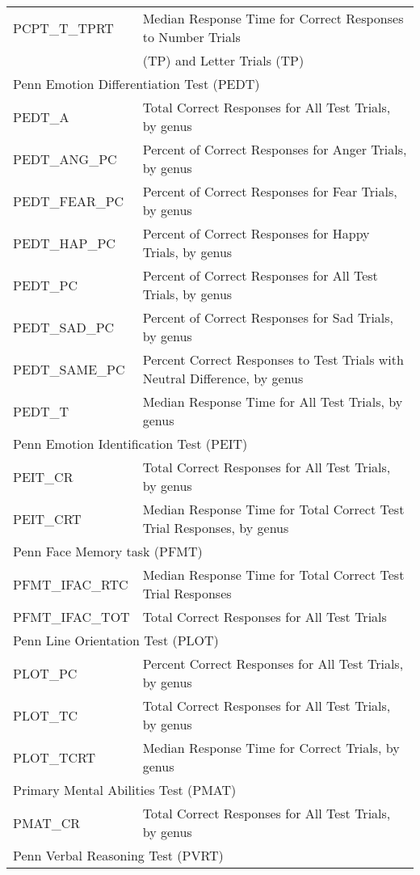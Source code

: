 \documentclass{article}
\begin{document}
\begin{longtable}{ll}
PCPT\_T\_TPRT & Median Response Time for Correct Responses to Number Trials\\
& (TP) and Letter Trials (TP)\\
\midrule
\multicolumn{2}{l}{Penn Emotion Differentiation Test (PEDT)}\\
\midrule
PEDT\_A & Total Correct Responses for All Test Trials, by genus\\
PEDT\_ANG\_PC & Percent of Correct Responses for Anger Trials, by genus\\
PEDT\_FEAR\_PC & Percent of Correct Responses for Fear Trials, by genus\\
PEDT\_HAP\_PC & Percent of Correct Responses for Happy Trials, by genus\\
PEDT\_PC & Percent of Correct Responses for All Test Trials, by genus\\
PEDT\_SAD\_PC & Percent of Correct Responses for Sad Trials, by genus\\
PEDT\_SAME\_PC & Percent Correct Responses to Test Trials with Neutral Difference, by genus\\
PEDT\_T & Median Response Time for All Test Trials, by genus\\
\midrule
\multicolumn{2}{l}{Penn Emotion Identification Test (PEIT)}\\
\midrule
PEIT\_CR & Total Correct Responses for All Test Trials, by genus\\
PEIT\_CRT & Median Response Time for Total Correct Test Trial Responses, by genus\\
\midrule
\multicolumn{2}{l}{Penn Face Memory task (PFMT)}\\
\midrule
PFMT\_IFAC\_RTC & Median Response Time for Total Correct Test Trial Responses\\
PFMT\_IFAC\_TOT & Total Correct Responses for All Test Trials\\
\midrule
\multicolumn{2}{l}{Penn Line Orientation Test (PLOT)}\\
\midrule
PLOT\_PC & Percent Correct Responses for All Test Trials, by genus\\
PLOT\_TC & Total Correct Responses for All Test Trials, by genus\\
PLOT\_TCRT & Median Response Time for Correct Trials, by genus\\
\midrule
\multicolumn{2}{l}{Primary Mental Abilities Test (PMAT)}\\
\midrule
PMAT\_CR & Total Correct Responses for All Test Trials, by genus\\
\midrule
\multicolumn{2}{l}{Penn Verbal Reasoning Test (PVRT)}\\

\end{longtable}
\end{document}
